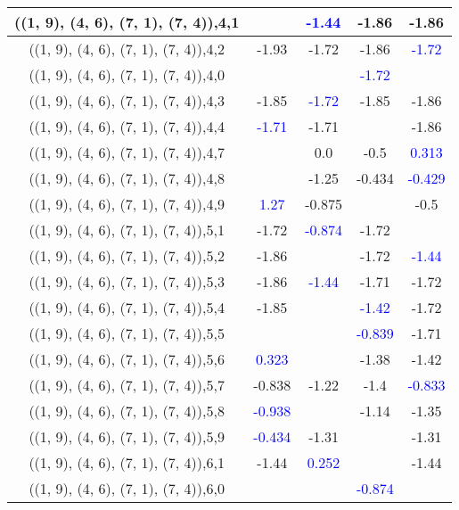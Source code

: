 \documentclass{article}
\begin{document}
\begin{center}
\begin{longtable}{|c|c|c|c|c|}
        	\hline
        	((1, 9), (4, 6), (7, 1), (7, 4)),4,1&& \textcolor{blue}{-1.44}&-1.86&-1.86\\
        	\hline
        	((1, 9), (4, 6), (7, 1), (7, 4)),4,2&-1.93&-1.72&-1.86& \textcolor{blue}{-1.72}\\
        	\hline
        	((1, 9), (4, 6), (7, 1), (7, 4)),4,0&&& \textcolor{blue}{-1.72}&\\
        	\hline
        	((1, 9), (4, 6), (7, 1), (7, 4)),4,3&-1.85& \textcolor{blue}{-1.72}&-1.85&-1.86\\
        	\hline
        	((1, 9), (4, 6), (7, 1), (7, 4)),4,4& \textcolor{blue}{-1.71}&-1.71&&-1.86\\
        	\hline
        	((1, 9), (4, 6), (7, 1), (7, 4)),4,7&&0.0&-0.5& \textcolor{blue}{0.313}\\
        	\hline
        	((1, 9), (4, 6), (7, 1), (7, 4)),4,8&&-1.25&-0.434& \textcolor{blue}{-0.429}\\
        	\hline
        	((1, 9), (4, 6), (7, 1), (7, 4)),4,9& \textcolor{blue}{1.27}&-0.875&&-0.5\\
        	\hline
        	((1, 9), (4, 6), (7, 1), (7, 4)),5,1&-1.72& \textcolor{blue}{-0.874}&-1.72&\\
        	\hline
        	((1, 9), (4, 6), (7, 1), (7, 4)),5,2&-1.86&&-1.72& \textcolor{blue}{-1.44}\\
        	\hline
        	((1, 9), (4, 6), (7, 1), (7, 4)),5,3&-1.86& \textcolor{blue}{-1.44}&-1.71&-1.72\\
        	\hline
        	((1, 9), (4, 6), (7, 1), (7, 4)),5,4&-1.85&& \textcolor{blue}{-1.42}&-1.72\\
        	\hline
        	((1, 9), (4, 6), (7, 1), (7, 4)),5,5&&& \textcolor{blue}{-0.839}&-1.71\\
        	\hline
        	((1, 9), (4, 6), (7, 1), (7, 4)),5,6& \textcolor{blue}{0.323}&&-1.38&-1.42\\
        	\hline
        	((1, 9), (4, 6), (7, 1), (7, 4)),5,7&-0.838&-1.22&-1.4& \textcolor{blue}{-0.833}\\
        	\hline
        	((1, 9), (4, 6), (7, 1), (7, 4)),5,8& \textcolor{blue}{-0.938}&&-1.14&-1.35\\
        	\hline
        	((1, 9), (4, 6), (7, 1), (7, 4)),5,9& \textcolor{blue}{-0.434}&-1.31&&-1.31\\
        	\hline
        	((1, 9), (4, 6), (7, 1), (7, 4)),6,1&-1.44& \textcolor{blue}{0.252}&&-1.44\\
        	\hline
        	((1, 9), (4, 6), (7, 1), (7, 4)),6,0&&& \textcolor{blue}{-0.874}&\\

\end{longtable}
\end{center}
\end{document}
